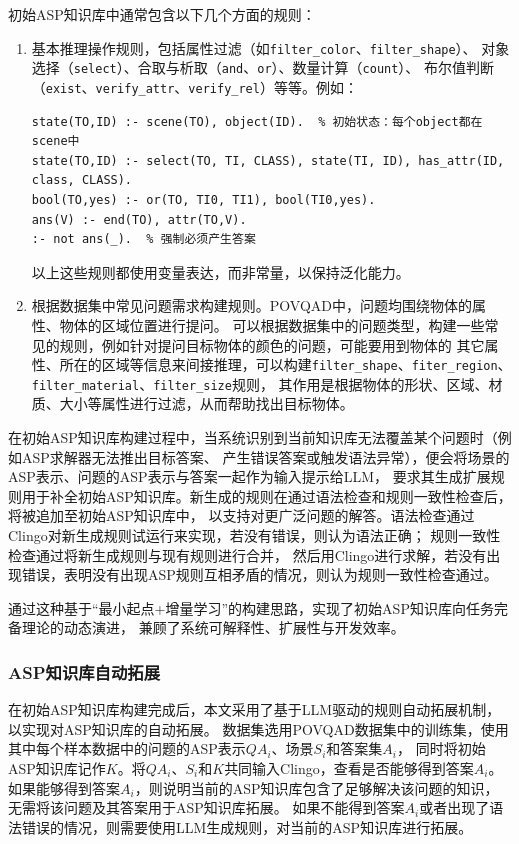 初始ASP知识库中通常包含以下几个方面的规则：
\begin{enumerate}[nosep]
\item 基本推理操作规则，包括属性过滤（如\texttt{filter\_color}、\texttt{filter\_shape}）、
对象选择（\texttt{select}）、合取与析取（\texttt{and}、\texttt{or}）、数量计算（\texttt{count}）、
布尔值判断（\texttt{exist}、\texttt{verify\_attr}、\texttt{verify\_rel}）等等。例如：
\begin{lstlisting}
state(TO,ID) :- scene(TO), object(ID).  % 初始状态：每个object都在scene中
state(TO,ID) :- select(TO, TI, CLASS), state(TI, ID), has_attr(ID, class, CLASS).
bool(TO,yes) :- or(TO, TI0, TI1), bool(TI0,yes).
ans(V) :- end(TO), attr(TO,V).
:- not ans(_).  % 强制必须产生答案
\end{lstlisting}
以上这些规则都使用变量表达，而非常量，以保持泛化能力。
\item 根据数据集中常见问题需求构建规则。POVQAD中，问题均围绕物体的属性、物体的区域位置进行提问。
可以根据数据集中的问题类型，构建一些常见的规则，例如针对提问目标物体的颜色的问题，可能要用到物体的
其它属性、所在的区域等信息来间接推理，可以构建\texttt{filter\_shape}、\texttt{fiter\_region}、
\texttt{filter\_material}、\texttt{filter\_size}规则，
其作用是根据物体的形状、区域、材质、大小等属性进行过滤，从而帮助找出目标物体。
\end{enumerate}

在初始ASP知识库构建过程中，当系统识别到当前知识库无法覆盖某个问题时（例如ASP求解器无法推出目标答案、
产生错误答案或触发语法异常），便会将场景的ASP表示、问题的ASP表示与答案一起作为输入提示给LLM，
要求其生成扩展规则用于补全初始ASP知识库。新生成的规则在通过语法检查和规则一致性检查后，将被追加至初始ASP知识库中，
以支持对更广泛问题的解答。语法检查通过Clingo对新生成规则试运行来实现，若没有错误，则认为语法正确；
规则一致性检查通过将新生成规则与现有规则进行合并，
然后用Clingo进行求解，若没有出现错误，表明没有出现ASP规则互相矛盾的情况，则认为规则一致性检查通过。

通过这种基于“最小起点+增量学习”的构建思路，实现了初始ASP知识库向任务完备理论的动态演进，
兼顾了系统可解释性、扩展性与开发效率。
\subsubsection{ASP知识库自动拓展}
在初始ASP知识库构建完成后，本文采用了基于LLM驱动的规则自动拓展机制，以实现对ASP知识库的自动拓展。
数据集选用POVQAD数据集中的训练集，使用其中每个样本数据中的问题的ASP表示$QA_i$、场景$S_i$和答案集$A_i$，
同时将初始ASP知识库记作$K$。将$QA_i$、$S_i$和$K$共同输入Clingo，查看是否能够得到答案$A_i$。
如果能够得到答案$A_i$，则说明当前的ASP知识库包含了足够解决该问题的知识，无需将该问题及其答案用于ASP知识库拓展。
如果不能得到答案$A_i$或者出现了语法错误的情况，则需要使用LLM生成规则，对当前的ASP知识库进行拓展。

